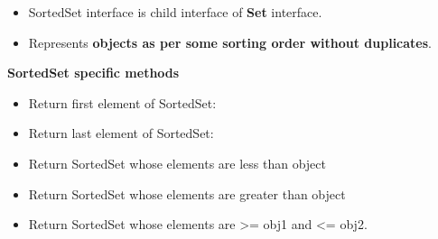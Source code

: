 \setlength{\columnsep}{3pt}
\begin{flushleft}
	
	\begin{itemize}
		\item SortedSet interface is child interface of \textbf{Set} interface.
		\item Represents \textbf{objects as per some sorting order without duplicates}.
	\end{itemize}

	\textbf{SortedSet specific methods}	
	\begin{itemize}
		\item Return first element of SortedSet:
		\bigskip
		\item Return last element of SortedSet:
		\bigskip
		\item Return SortedSet whose elements are less than object
		\bigskip
		\item Return SortedSet whose elements are greater than object
		\bigskip 
		\item Return SortedSet whose elements are >= obj1 and <= obj2.
		
		
	\end{itemize}
	
\end{flushleft}

\newpage

